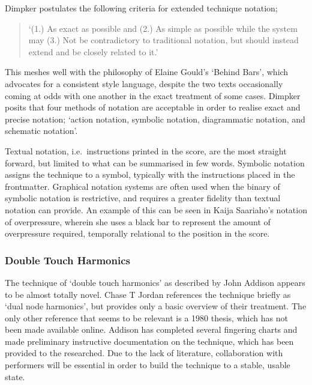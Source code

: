 Dimpker postulates the following criteria for extended technique notation; \begin{quote}
    `(1.) As exact as possible and (2.) As simple as possible while the system may (3.) Not be contradictory to
traditional notation, but should instead extend and be closely related to it.'\autocite[3]{dimpkerExtendedNotationDepiction2012}
\end{quote}
This meshes well with the philosophy of Elaine Gould's `Behind Bars', which advocates for a consistent style language, despite the two texts occasionally coming at odds with one another in the exact treatment of some cases.\autocite[120--121, 61]{dimpkerExtendedNotationDepiction2012,gouldBars2011}
Dimpker posits that four methods of notation are acceptable in order to realise exact and precise notation; `action notation, symbolic notation, diagrammatic notation, and schematic notation'.\autocite[33]{dimpkerExtendedNotationDepiction2012}

Textual notation, i.e.\ instructions printed in the score, are the most straight forward, but limited to what can be summarised in few words.
Symbolic notation assigns the technique to a symbol, typically with the instructions placed in the frontmatter.
Graphical notation systems are often used when the binary of symbolic notation is restrictive, and requires a greater fidelity than textual notation can provide. 
An example of this can be seen in Kaija Saariaho's notation of overpressure, wherein she uses a black bar to represent the amount of overpressure required, temporally relational to the position in the score.

\subsubsection{Double Touch Harmonics}
The technique of `double touch harmonics' as described by John Addison appears to be almost totally novel. 
Chase T Jordan references the technique briefly as `dual node harmonics', but provides only a basic overview of their treatment.\autocite[36]{jordanOldInstrumentsNew2020}
The only other reference that seems to be relevant is a 1980 thesis, which has not been made available online.\autocite{woodrichMultinodalPerformanceTechnique1980}
Addison has completed several fingering charts and made preliminary instructive documentation on the technique, which has been provided to the researched.
Due to the lack of literature, collaboration with performers will be essential in order to build the technique to a stable, usable state.


